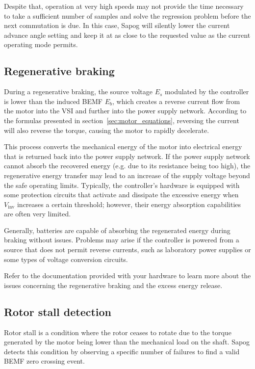 \documentclass{zubaxdoc}
\begin{document}
Despite that, operation at very high speeds may not provide the time necessary to take a sufficient
number of samples and solve the regression problem before the next commutation is due.
In this case, Sapog will silently lower the current advance angle setting and keep it at as close
to the requested value as the current operating mode permits.

\subsection{Regenerative braking}

During a regenerative braking, the source voltage $E_s$ modulated by the controller is lower than the
induced BEMF $E_b$, which creates a reverse current flow from the motor into the VSI
and further into the power supply network.
According to the formulas presented in section~\ref{sec:motor_equations},
reversing the current will also reverse the torque, causing the motor to rapidly decelerate.

This process converts the mechanical energy of the motor into electrical energy that is returned back into the
power supply network.
If the power supply network cannot absorb the recovered energy (e.g. due to its resistance being too high),
the regenerative energy transfer may lead to an increase of the supply voltage beyond the safe operating limits.
Typically, the controller's hardware is equipped with some protection circuits that activate and dissipate the
excessive energy when $V_\text{inv}$ increases a certain threshold;
however, their energy absorption capabilities are often very limited.

Generally, batteries are capable of absorbing the regenerated energy during braking without issues.
Problems may arise if the controller is powered from a source that does not permit reverse currents,
such as laboratory power supplies or some types of voltage conversion circuits.

Refer to the documentation provided with your hardware to learn more about the issues
concerning the regenerative braking and the excess energy release.

\subsection{Rotor stall detection}\label{sec:stall_detection}

Rotor stall is a condition where the rotor ceases to rotate due to the torque generated by the motor
being lower than the mechanical load on the shaft.
Sapog detects this condition by observing a specific number of failures to find
a valid BEMF zero crossing event.
\end{document}
